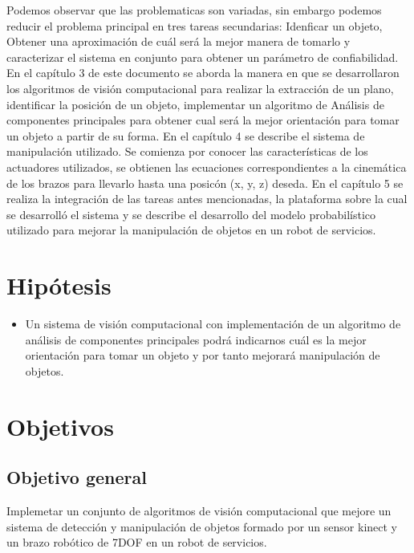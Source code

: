 \documentclass[a4paper, openright, 12pt]{report}
\begin{document}
		Podemos observar que las problematicas son variadas, sin embargo podemos reducir el problema principal en tres tareas secundarias: Idenficar un objeto, Obtener una aproximación de cuál será la mejor manera de tomarlo y caracterizar el sistema en conjunto para obtener un parámetro de confiabilidad.\\

		En el capítulo 3 de este documento se aborda la manera en que se desarrollaron los algoritmos de visión computacional para realizar la extracción de un plano, identificar la posición de un objeto, implementar un algoritmo de Análisis de componentes principales para obtener cual será la mejor orientación para tomar un objeto a partir de su forma. En el capítulo 4 se describe el sistema de manipulación utilizado. Se comienza por conocer las características de los actuadores utilizados, se obtienen las ecuaciones correspondientes a la cinemática de los brazos para llevarlo hasta una posicón (x, y, z) deseda. En el capítulo 5 se realiza la integración de las tareas antes mencionadas, la plataforma sobre la cual se desarrolló el sistema y se describe el desarrollo del modelo probabilístico utilizado para mejorar la manipulación de objetos en un robot de servicios.\\


	\section{Hipótesis}
		\begin{itemize}

			\item Un sistema de visión computacional con implementación de un algoritmo de análisis de componentes principales podrá indicarnos cuál es la mejor orientación para tomar un objeto y por tanto mejorará manipulación de objetos.\\

		\end{itemize}

	\section{Objetivos}
		\subsection*{Objetivo general}
			Implemetar un conjunto de algoritmos de visión computacional que mejore un sistema de detección y manipulación de objetos formado por un sensor kinect y un brazo robótico de 7DOF en un robot de servicios.
\end{document}

